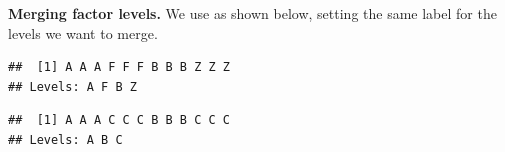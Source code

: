 \documentclass[krantz2]{krantz}\usepackage{knitr}
\begin{document}
\begin{explainbox}
\textbf{Merging factor levels.} We use  as shown below, setting the same label for the levels we want to merge.

\begin{knitrout}\footnotesize
{}\color{fgcolor}\begin{kframe}
\begin{alltt}
 \hlkwb{<-} \hlstd{(}\hlstd{,} \hlstd{,}  \hlstd{=} \hlstd{(}\hlstd{,} \hlstd{,} \hlstd{,} \hlstd{))}
\end{alltt}
\begin{verbatim}
##  [1] A A A F F F B B B Z Z Z
## Levels: A F B Z
\end{verbatim}
\begin{alltt}
        \hlstd{=} \hlstd{(}\hlstd{,} \hlstd{,} \hlstd{,} \hlstd{),}
        \hlstd{=} \hlstd{(}\hlstd{,} \hlstd{,} \hlstd{,} \hlstd{))}
\end{alltt}
\begin{verbatim}
##  [1] A A A C C C B B B C C C
## Levels: A B C
\end{verbatim}
\end{kframe}
\end{knitrout}
\end{explainbox}
\end{document}
